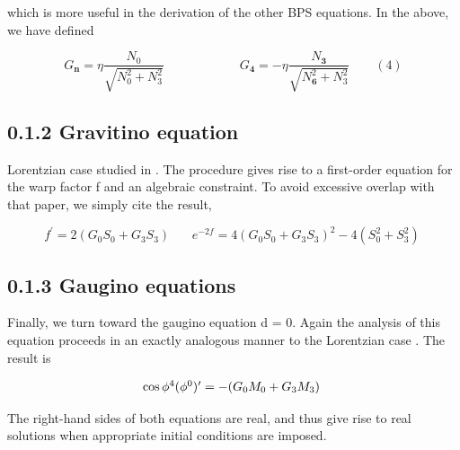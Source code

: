 \documentclass{article}
\begin{document}
which is more useful in the derivation of the other BPS equations. In the above, we have
defined


\begin{equation}
G _ { \mathbf { n } } = \eta \frac { N _ { 0 } } { \sqrt { N _ { 0 } ^ { 2 } + N _ { 3 } ^ { 2 } } } \qquad \qquad \qquad G _ { \mathbf { 4 } } = - \eta \frac { N _ { \mathbf { 3 } } } { \sqrt { N _ { \mathbf { 6 } } ^ { 2 } + N _ { 3 } ^ { 2 } } } \qquad ( 4 )
\end{equation}


\subsection*{0.1.2 Gravitino equation}


Lorentzian case studied in . The procedure gives rise to a first-order equation for the warp
factor f and an algebraic constraint. To avoid excessive overlap with that paper, we simply
cite the result,


\begin{equation}
f ^ { \prime } = 2 ( G _ { 0 } S _ { 0 } + G _ { 3 } S _ { 3 } ) ~ ~ ~ ~ ~ ~ ~ ~ e ^ { - 2 f } = 4 ( G _ { 0 } S _ { 0 } + G _ { 3 } S _ { 3 } ) ^ { 2 } - 4 ( S _ { 0 } ^ { 2 } + S _ { 3 } ^ { 2 } ) ~
\end{equation}


\subsection*{0.1.3 Gaugino equations}


Finally, we turn toward the gaugino equation d = 0. Again the analysis of this equation
proceeds in an exactly analogous manner to the Lorentzian case . The result is


\begin{equation}
\begin{array} { c c } { \cos \phi ^ { 4 } ( \phi ^ { 0 } ) ^ { \prime } = - ( G _ { 0 } M _ { 0 } + G _ { 3 } M _ { 3 } ) ~ }\end{array}
\end{equation}


The right-hand sides of both equations are real, and thus give rise to real solutions when
appropriate initial conditions are imposed.
\end{document}
